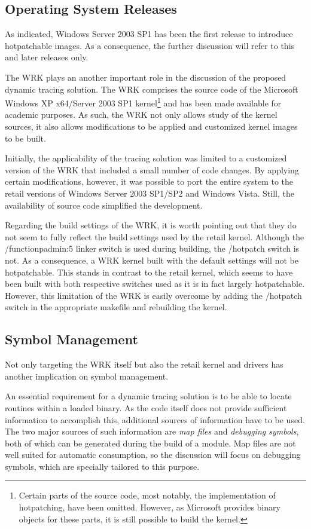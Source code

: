 \subsection{Operating System Releases}
As indicated, Windows Server 2003 SP1 has been the first release to introduce hotpatchable 
images. As a consequence, the further discussion will refer to this and later releases only.

The WRK plays an another important role 
in the discussion of the proposed dynamic tracing solution. The WRK comprises 
the source code of the Microsoft Windows XP x64/Server 2003 SP1 
kernel\footnote{Certain parts of the source code, most notably, the implementation of 
hotpatching, have been omitted. However, as Microsoft provides
binary objects for these parts, it is still possible to build the kernel.}
 and has been made available for academic purposes. As such,
the WRK not only allows study of the kernel sources, it also allows 
modifications to be applied and customized kernel images to be built.

Initially, the applicability of the tracing solution was limited to a customized
version of the WRK that included a small number of code changes. By applying
certain modifications, however, it was possible to port the entire system
to the retail versions of Windows Server 2003 SP1/SP2 and Windows Vista. Still,
the availability of source code simplified the development.

Regarding the build settings of the WRK, it is worth pointing out that they do not
seem to fully reflect the build settings used by the retail kernel. Although
the /functionpadmin:5 linker switch is used during building, the /hotpatch switch is
not. As a consequence, a WRK kernel built with the default settings will not be 
hotpatchable. This stands in contrast to the retail kernel, which
seems to have been built with both respective switches used as it is in fact 
largely hotpatchable. However, this limitation of the WRK is easily overcome 
by adding the /hotpatch switch in the appropriate makefile and rebuilding the kernel.




\subsection{Symbol Management}
Not only targeting the WRK itself but also the retail kernel and drivers has another
implication on symbol management. 

An essential requirement for a dynamic tracing solution is to be able to locate
routines within a loaded binary. As the code itself does not provide sufficient
information to accomplish this, additional sources of information have to be used. The
two major sources of such information are \emph{map files} and \emph{debugging symbols},
both of which can be generated during the build of a module. Map files are not well
suited for automatic consumption, so the discussion will focus on debugging symbols,
which are specially tailored to this purpose.


